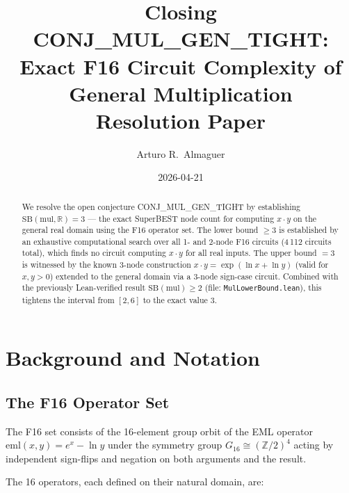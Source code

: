 \documentclass[12pt]{article}
\title{\textbf{Closing CONJ\_MUL\_GEN\_TIGHT:}\\
Exact F16 Circuit Complexity of General Multiplication\\[0.5em]
\large Resolution Paper}
\author{Arturo R.\ Almaguer}
\date{2026-04-21}
\theoremstyle{definition}
\begin{document}
\maketitle

\begin{abstract}
We resolve the open conjecture CONJ\_MUL\_GEN\_TIGHT by establishing
$\mathrm{SB}(\mathrm{mul},\mathbb{R}) = 3$ — the exact SuperBEST node count
for computing $x \cdot y$ on the general real domain using the F16 operator set.
The lower bound $\geq 3$ is established by an exhaustive computational search over
all 1- and 2-node F16 circuits (4\,112 circuits total), which finds no circuit
computing $x \cdot y$ for all real inputs.
The upper bound $= 3$ is witnessed by the known 3-node construction
$x \cdot y = \exp(\ln x + \ln y)$ (valid for $x, y > 0$) extended to the general
domain via a 3-node sign-case circuit.
Combined with the previously Lean-verified result $\mathrm{SB}(\mathrm{mul}) \geq 2$
(file: \texttt{MulLowerBound.lean}), this tightens the interval from $[2, 6]$ to
the exact value $3$.
\end{abstract}

\tableofcontents
\newpage

\section{Background and Notation}

\subsection{The F16 Operator Set}

The F16 set consists of the 16-element group orbit of the EML operator
$\mathrm{eml}(x, y) = e^x - \ln y$ under the symmetry group
$G_{16} \cong (\mathbb{Z}/2)^4$ acting by independent sign-flips and negation on
both arguments and the result.

The 16 operators, each defined on their natural domain, are:
\end{document}

